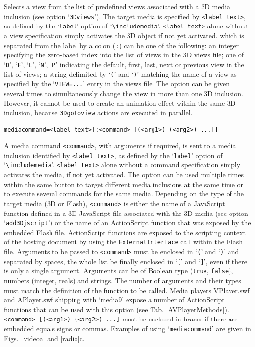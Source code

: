 \documentclass[a4paper]{article}
\begin{document}
Selects a view from the list of predefined views associated with a 3D media inclusion (see option `\verb+3Dviews+'). The target media is specified by \verb+<label text>+, as defined by the `\verb+label+' option of `\verb+\includemedia+'. \verb+<label text>+ alone without a view specification simply activates the 3D object if not yet activated. {\tt<view specification>} which is separated from the label by a colon (\verb+:+) can be one of the following: an integer specifying the zero-based index into the list of views in the 3D views file; one of `\verb+D+', `\verb+F+', `\verb+L+', `\verb+N+', `\verb+P+' indicating the default, first, last, next or previous view in the list of views; a string delimited by `\verb+(+' and `\verb+)+' matching the name of a view as specified by the `\verb+VIEW=...+' entry in the views file. The option can be given several times to simultaneously change the view in more than one 3D inclusion. However, it cannot be used to create an animation effect within the same 3D inclusion, because \verb+3Dgotoview+ actions are executed in parallel.
\begin{verbatim}
mediacommand=<label text>[:<command> [(<arg1>) (<arg2>) ...]]
\end{verbatim}
A media command \verb+<command>+, with arguments if required, is sent to a media inclusion identified by \verb+<label text>+, as defined by the `\verb+label+' option of `\verb+\includemedia+'. \verb+<label text>+ alone without a command specification simply activates the media, if not yet activated. The option can be used multiple times within the same button to target different media inclusions at the same time or to execute several commands for the same media. Depending on the type of the target media (3D or Flash), \verb+<command>+ is either the name of a JavaScript function defined in a 3D JavaScript file associated with the 3D media (see option `\verb+add3Djscript+') or the name of an ActionScript function that was exposed by the embedded Flash file. ActionScript functions are exposed to the scripting context of the hosting document by using the \verb+ExternalInterface+ call within the Flash file. Arguments to be passed to \verb+<command>+ must be enclosed in `\verb+(+' and `\verb+)+' and separated by spaces, the whole list be finally enclosed in `\verb+[+' and `\verb+]+', even if there is only a single argument. Arguments can be of Boolean type (\verb+true+, \verb+false+), numbers (integer, reals) and strings. The number of arguments and their types must match the definition of the function to be called. Media players VPlayer.swf and APlayer.swf shipping with `media9' expose a number of ActionScript functions that can be used with this option (see Tab. \ref{AVPlayerMethods}). \verb+<command> [(<arg1>) (<arg2>) ...]+ must be enclosed in braces if there are embedded equals signs or commas. Examples of using `\verb+mediacommand+' are given in Figs.~\ref{videoa} and \ref{radio}c.
\end{document}

